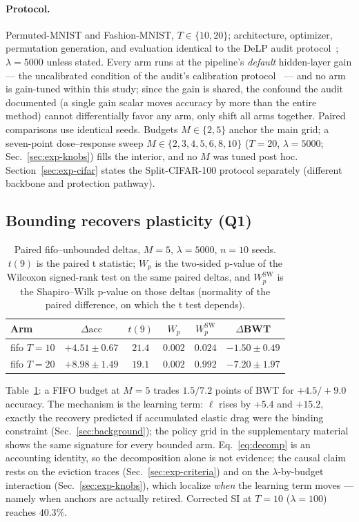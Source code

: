 \documentclass[review,12pt,number]{elsarticle}
\newcommand{\delp}{DeLP}
\newcommand{\acc}{\mathrm{acc}}
\begin{document}
\paragraph{Protocol.}
Permuted-MNIST and Fashion-MNIST, $T \in \{10, 20\}$; architecture,
optimizer, permutation generation, and evaluation identical to the
\delp{} audit protocol~\cite{zhou2026delp}; $\lambda{=}5000$ unless stated. Every arm runs at the pipeline's
\emph{default} hidden-layer gain --- the uncalibrated condition of the
audit's calibration protocol~\cite{zhou2026delp} --- and no arm is
gain-tuned within this study; since the gain is shared, the confound
the audit documented (a single gain scalar moves accuracy by more than
the entire method) cannot differentially favor any arm, only shift all
arms together. Paired comparisons use identical seeds.
Budgets $M \in \{2, 5\}$ anchor the main grid; a seven-point
dose--response sweep $M \in \{2,3,4,5,6,8,10\}$ ($T{=}20$,
$\lambda{=}5000$; Sec.~\ref{sec:exp-knobs}) fills the interior, and no
$M$ was tuned post hoc.
Section~\ref{sec:exp-cifar} states the Split-CIFAR-100 protocol
separately (different backbone and protection pathway).

\subsection{Bounding recovers plasticity (Q1)}
\label{sec:exp-main}

\begin{table}[t]
\centering\small
\caption{Paired fifo--unbounded deltas, $M{=}5$, $\lambda{=}5000$,
$n{=}10$ seeds. $t(9)$ is the paired t statistic; $W_p$ is the
two-sided p-value of the Wilcoxon signed-rank test on the same paired
deltas, and $W_p^{\mathrm{SW}}$ is the Shapiro--Wilk p-value on those
deltas (normality of the paired difference, on which the t test
depends).}
\label{tab:paired}
\begin{tabular}{lccccc}
\toprule
Arm & $\Delta\acc$ & $t(9)$ & $W_p$ & $W_p^{\mathrm{SW}}$ & $\Delta$BWT \\
\midrule
fifo $T{=}10$ & $+4.51\pm0.67$ & $21.4$ & $0.002$ & $0.024$ & $-1.50\pm0.49$ \\
fifo $T{=}20$ & $+8.98\pm1.49$ & $19.1$ & $0.002$ & $0.992$ & $-7.20\pm1.97$ \\
\bottomrule
\end{tabular}
\end{table}



Table~\ref{tab:paired}: a FIFO budget at $M{=}5$ trades $1.5/7.2$ points
of BWT for $+4.5/+9.0$ accuracy. The mechanism is the learning term:
$\ell$ rises by $+5.4$ and $+15.2$, exactly the recovery predicted if
accumulated elastic drag were the binding constraint
(Sec.~\ref{sec:background}); the policy grid in the supplementary
material shows the same signature for every bounded arm.
Eq.~\ref{eq:decomp} is an accounting identity, so the decomposition
alone is not evidence; the causal claim rests on the eviction traces
(Sec.~\ref{sec:exp-criteria}) and on the $\lambda$-by-budget
interaction (Sec.~\ref{sec:exp-knobs}), which localize \emph{when}
the learning term moves --- namely when anchors are actually retired.
Corrected SI at $T{=}10$ ($\lambda{=}100$) reaches $40.3\%$.
\end{document}
